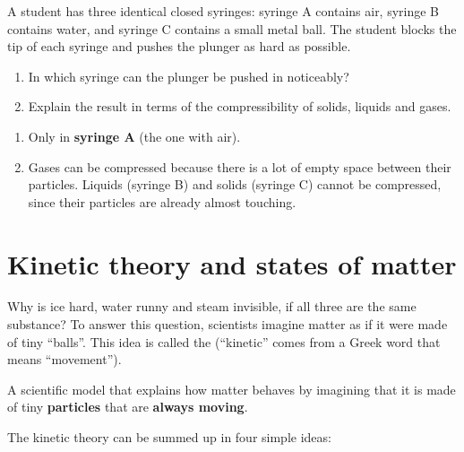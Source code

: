 \begin{exercise}
    A student has three identical closed syringes: syringe A contains air, syringe B contains water, and syringe C contains a small metal ball. The student blocks the tip of each syringe and pushes the plunger as hard as possible.
    \begin{enumerate}[label=\letraminuscula]
        \item In which syringe can the plunger be pushed in noticeably?
        \item Explain the result in terms of the compressibility of solids, liquids and gases.
    \end{enumerate}
    \begin{solu}
        \begin{enumerate}[label=\alph*)]
            \item Only in \textbf{syringe A} (the one with air).
            \item Gases can be compressed because there is a lot of empty space between their particles. Liquids (syringe B) and solids (syringe C) cannot be compressed, since their particles are already almost touching.
        \end{enumerate}
    \end{solu}
\end{exercise}


\section{Kinetic theory and states of matter}

Why is ice hard, water runny and steam invisible, if all three are the same substance? To answer this question, scientists imagine matter as if it were made of tiny ``balls''. This idea is called the  (``kinetic'' comes from a Greek word that means ``movement'').

\begin{definition}
    A scientific model that explains how matter behaves by imagining that it is made of tiny \textbf{particles} that are \textbf{always moving}.
\end{definition}

The kinetic theory can be summed up in four simple ideas:

